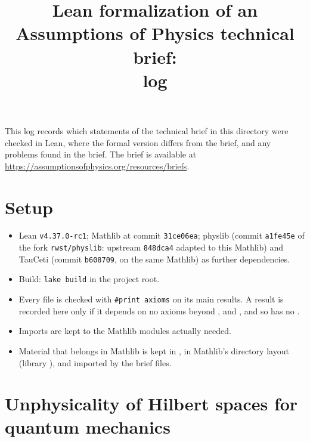 \documentclass[11pt]{article}
\title{Lean formalization of an Assumptions of Physics technical brief:\\ log}
\author{}
\date{}
\begin{document}
\maketitle

\noindent
This log records which statements of the technical brief in this directory were checked in Lean,
where the formal version differs from the brief, and any problems found in the brief.
The brief is available at \url{https://assumptionsofphysics.org/resources/briefs}.

\section*{Setup}

\begin{itemize}
\item Lean \texttt{v4.37.0-rc1}; Mathlib at commit \texttt{31ce06ea}; physlib (commit \texttt{a1fe45e}
  of the fork \texttt{rwst/physlib}: upstream \texttt{848dca4} adapted to this Mathlib) and
  TauCeti (commit \texttt{b608709}, on the same Mathlib) as further dependencies.
\item Build: \texttt{lake build} in the project root.
\item Every file is checked with \texttt{\#print axioms} on its main results. A result is
  recorded here only if it depends on no axioms beyond ,
   and , and so has no .
\item Imports are kept to the Mathlib modules actually needed.
\item Material that belongs in Mathlib is kept in , in Mathlib's directory
  layout (library ), and imported by the brief files.
\end{itemize}



\section{Unphysicality of Hilbert spaces for quantum mechanics}
\end{document}
